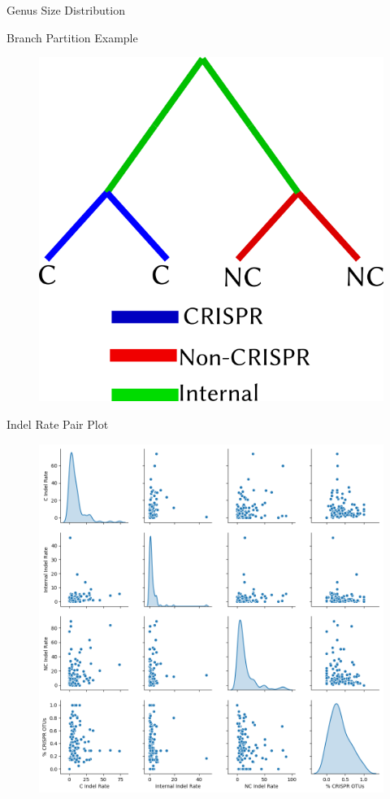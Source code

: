 \documentclass[dvipsnames]{beamer}
\newcommand{\backupend}{
     \addtocounter{framenumbervorappendix}{-\value{framenumber}}
        \addtocounter{framenumber}{\value{framenumbervorappendix}}
}
\begin{document}
\begin{frame}[fragile]{Genus Size Distribution}
\end{frame}
\begin{frame}[fragile]{Branch Partition Example}
    \begin{figure}[htb!]
        \includegraphics[width=0.5\linewidth]{partition_example.png}
    \end{figure}
\end{frame}
\begin{frame}[fragile]{Indel Rate Pair Plot}
    \begin{figure}[htb!]
        \includegraphics[width=0.6\linewidth]{pairplot.png}
    \end{figure}
\end{frame}
\backupend
\end{document}
